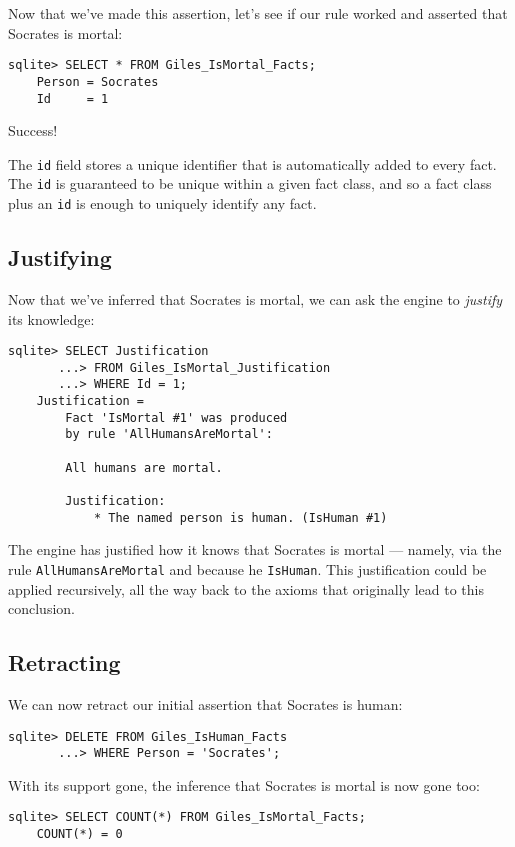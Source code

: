 \documentclass[letterpaper,10pt]{article}
\begin{document}
Now that we've made this assertion, let's see if our rule worked and asserted that Socrates is mortal:
\begin{lstlisting}[frame=none,numbers=none]
    sqlite> SELECT * FROM Giles_IsMortal_Facts;
    Person = Socrates
    Id     = 1
\end{lstlisting}
Success!

The \texttt{id} field stores a unique identifier that is automatically added to every fact.
The \texttt{id} is guaranteed to be unique within a given fact class, and so a fact class plus an \texttt{id} is enough to uniquely identify any fact.

\subsection{Justifying}
Now that we've inferred that Socrates is mortal, we can ask the engine to \emph{justify} its knowledge:
\begin{lstlisting}[frame=none,numbers=none]
    sqlite> SELECT Justification
       ...> FROM Giles_IsMortal_Justification
       ...> WHERE Id = 1;
    Justification =
        Fact 'IsMortal #1' was produced
        by rule 'AllHumansAreMortal':

        All humans are mortal.

        Justification:
            * The named person is human. (IsHuman #1)
\end{lstlisting}

The engine has justified how it knows that Socrates is mortal --- namely, via the rule \texttt{AllHumansAreMortal} and because he \texttt{IsHuman}.
This justification could be applied recursively, all the way back to the axioms that originally lead to this conclusion.

\subsection{Retracting}
We can now retract our initial assertion that Socrates is human:
\begin{lstlisting}[frame=none,numbers=none]
    sqlite> DELETE FROM Giles_IsHuman_Facts
       ...> WHERE Person = 'Socrates';
\end{lstlisting}
With its support gone, the inference that Socrates is mortal is now gone too:
\begin{lstlisting}[frame=none,numbers=none]
    sqlite> SELECT COUNT(*) FROM Giles_IsMortal_Facts;
    COUNT(*) = 0
\end{lstlisting}
\end{document}
